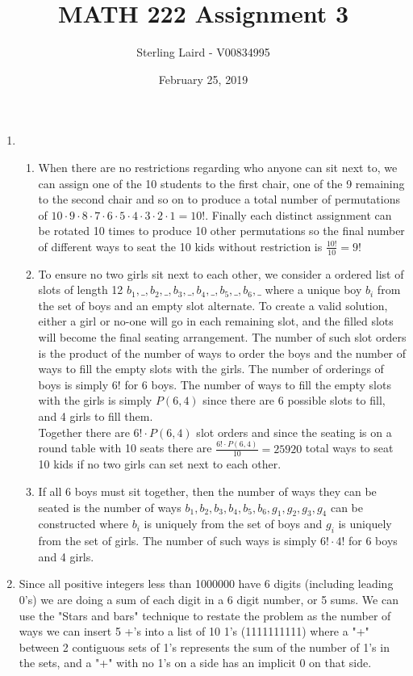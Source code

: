 \documentclass[11pt]{article}
\title{MATH 222 Assignment 3}
\author{Sterling Laird - V00834995}
\date{February 25, 2019}
\begin{document}
\maketitle
\pagebreak

\begin{enumerate}[]
\item
\begin{enumerate}[label=\alph*]
\item
	When there are no restrictions regarding who anyone can sit next to, we can assign one of the 10 students to the first chair, one of the 9 remaining to the second chair and so on to produce a total number of permutations of $10\cdot9\cdot8\cdot7\cdot6\cdot5\cdot4\cdot3\cdot2\cdot1 = 10!$. Finally each distinct assignment can be rotated 10 times to produce 10 other permutations so the final number of different ways to seat the 10 kids without restriction is $\frac{10!}{10} = 9!$
\item
	To ensure no two girls sit next to each other, we consider a ordered list of slots of length 12 $b_1,\_,b_2,\_,b_3,\_,b_4,\_,b_5,\_,b_6,\_$ where a unique boy $b_i$ from the set of boys and an empty slot alternate. To create a valid solution, either a girl or no-one will go in each remaining slot, and the filled slots will become the final seating arrangement. The number of such slot orders is the product of the number of ways to order the boys and the number of ways to fill the empty slots with the girls. The number of orderings of boys is simply $6!$ for 6 boys. The number of ways to fill the empty slots with the girls is simply $P(6,4)$ since there are 6 possible slots to fill, and 4 girls to fill them.\\
	Together there are $6!\cdot P(6,4)$ slot orders and since the seating is on a round table with 10 seats there are  $\frac{6!\cdot P(6,4)}{10} = 25920$ total ways to seat 10 kids if no two girls can set next to each other.
\item
	If all 6 boys must sit together, then the number of ways they can be seated is the number of ways $b_1,b_2,b_3,b_4,b_5,b_6,g_1,g_2,g_3,g_4$ can be constructed where $b_i$ is uniquely from the set of boys and $g_i$ is uniquely from the set of girls. The number of such ways is simply $6!\cdot4!$ for 6 boys and 4 girls.
\end{enumerate}
\item
	Since all positive integers less than 1000000 have 6 digits (including leading 0's) we are doing a sum of each digit in a 6 digit number, or 5 sums. We can use the "Stars and bars" technique to restate the problem as the number of ways we can insert 5 +'s into a list of 10 1's (1111111111) where a "+" between 2 contiguous sets of 1's represents the sum of the number of 1's in the sets, and a "+" with no 1's on a side has an implicit 0 on that side.\\

\end{enumerate}
\end{document}
